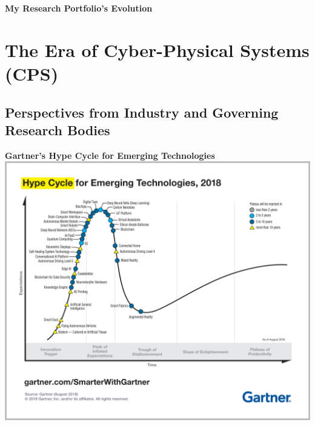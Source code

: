 \documentclass[aspectratio=43]{beamer}
\begin{document}
\begin{frame}{\textbf{My Research Portfolio's Evolution}}
\end{frame}

\section{The Era of Cyber-Physical Systems (CPS)}

\subsection{Perspectives from Industry and Governing Research Bodies}

\begin{frame}{\textbf{Gartner's Hype Cycle for Emerging Technologies}}
    \centering
    \href{https://www.gartner.com/smarterwithgartner/5-trends-emerge-in-gartner-hype-cycle-for-emerging-technologies-2018/}{\includegraphics[width=\textwidth, height=0.8\textheight, frame]{Figures/2018_Hype_Cycle.png}}
\end{frame}
\end{document}
